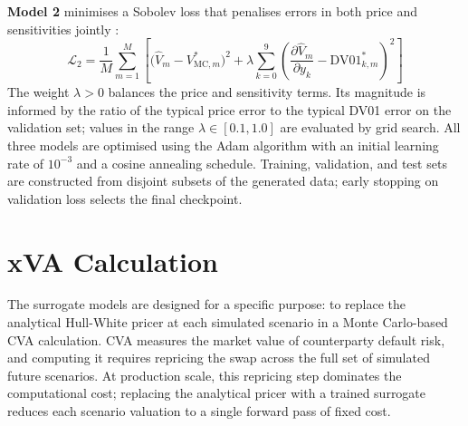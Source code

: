   \noindent
  \textbf{Model 2} minimises a Sobolev loss that penalises errors in both price
  and sensitivities jointly \cite{huge2020differential}:
  \begin{equation}
    \mathcal{L}_{2}
      = \frac{1}{M}\sum_{m=1}^{M}\left[
          \bigl(\hat{V}_m - V_{\mathrm{MC},m}^*\bigr)^2
          + \lambda\sum_{k=0}^{9}
            \!\left(
              \frac{\partial\hat{V}_m}{\partial y_k}
              - \mathrm{DV01}_{k,m}^*
            \right)^{\!2}
        \right]
    \label{eq:loss_2}
  \end{equation}
  The weight $\lambda > 0$ balances the price and sensitivity terms. Its
  magnitude is informed by the ratio of the typical price error to the typical
  DV01 error on the validation set; values in the range $\lambda \in [0.1, 1.0]$
  are evaluated by grid search. All three models are optimised using the Adam
  algorithm \cite{kingma2015adam} with an initial learning rate of $10^{-3}$ and
  a cosine annealing schedule. Training, validation, and test sets are constructed
  from disjoint subsets of the generated data; early stopping on validation loss
  selects the final checkpoint.


  \section{xVA Calculation}
  \label{sec:xva}

  The surrogate models are designed for a specific purpose: to replace the
  analytical Hull-White pricer at each simulated scenario in a Monte Carlo-based
  CVA calculation. CVA measures the market value of counterparty default risk, and
  computing it requires repricing the swap across the full set of simulated future
  scenarios. At production scale, this repricing step dominates the computational
  cost; replacing the analytical pricer with a trained surrogate reduces each
  scenario valuation to a single forward pass of fixed cost.

